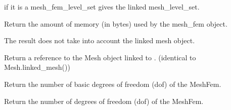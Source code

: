 \documentclass[a4paper,11pt,english]{sphinxmanual}
\begin{document}
\begin{fulllineitems}
\begin{fulllineitems}
\end{fulllineitems}


\begin{fulllineitems}
\label{\detokenize{python/cmdref_MeshFem:getfem.MeshFem.linked_mesh_levelset}}
if it is a mesh\_fem\_level\_set gives the linked mesh\_level\_set.

\end{fulllineitems}


\begin{fulllineitems}
\label{\detokenize{python/cmdref_MeshFem:getfem.MeshFem.memsize}}
Return the amount of memory (in bytes) used by the mesh\_fem object.

The result does not take into account the linked mesh object.

\end{fulllineitems}


\begin{fulllineitems}
\label{\detokenize{python/cmdref_MeshFem:getfem.MeshFem.mesh}}
Return a reference to the Mesh object linked to .
(identical to Mesh.linked\_mesh())

\end{fulllineitems}


\begin{fulllineitems}
\label{\detokenize{python/cmdref_MeshFem:getfem.MeshFem.nb_basic_dof}}
Return the number of basic degrees of freedom (dof) of the MeshFem.

\end{fulllineitems}


\begin{fulllineitems}
\label{\detokenize{python/cmdref_MeshFem:getfem.MeshFem.nbdof}}
Return the number of degrees of freedom (dof) of the MeshFem.


\end{fulllineitems}
\end{fulllineitems}
\end{document}
